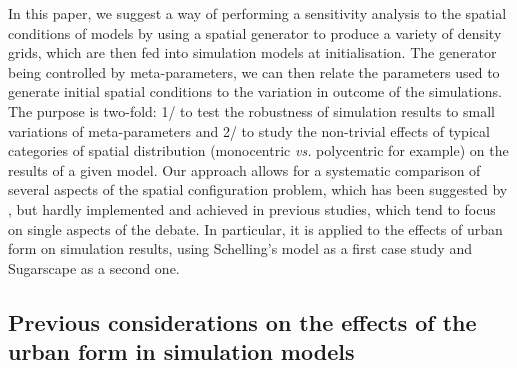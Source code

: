 \documentclass[Afour,sageh,times]{sagej}
\begin{document}
In this paper, we suggest a way of performing a sensitivity analysis to the spatial conditions of models by using a spatial generator to produce a variety of density grids, which are then fed into simulation models at initialisation. The generator being controlled by meta-parameters, we can then relate the parameters used to generate initial spatial conditions to the variation in outcome of the simulations. The purpose is two-fold: 1/ to test the robustness of simulation results to small variations of meta-parameters and 2/ to study the non-trivial effects of typical categories of spatial distribution (monocentric \textit{vs.} polycentric for example) on the results of a given model. Our approach allows for a systematic comparison of several aspects of the spatial configuration problem, which has been suggested by \citet{filatova2013spatial}, but hardly implemented and achieved in previous studies, which tend to focus on single aspects of the debate. In particular, it is applied to the effects of urban form on simulation results, using Schelling's model as a first case study and Sugarscape as a second one. 

\subsection{Previous considerations on the effects of the urban form in simulation models}


\end{document}
